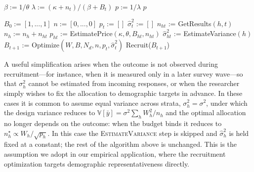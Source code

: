 \documentclass[letterpaper,12pt]{article}
\theoremstyle{proposition}
\begin{document}
\begin{algorithm}
\caption{Optimizing Stratified Recruitment with Unknown Costs and Variances}
\begin{algorithmic}
 
\State $\beta := 1 / \theta$ 
\State $\lambda := (\kappa + n_t) / (\beta + B_t)$ 
\State $p := 1 / \lambda$ 
\State \Return $p$ 
\EndProcedure

\State $B_0 := [1,...,1]$ 
\State $n := [0,...,0]$ 
 
  \State $p_t := []$ 
  \State $\hat\sigma^2_t := []$ 
   
    \State $n_{ht}$ := GetResults$(h, t)$ 
    \State $n_h := n_h + n_{ht}$ 
    \State $p_{ht}$ := EstimatePrice$(\kappa, \theta, B_{ht}, n_{ht})$ 
    \State $\hat\sigma^2_{ht}$ := EstimateVariance$(h)$ 
  \EndFor
  \State $B_{t+1}$ := Optimize$(W, B, N_d, n, p_t, \hat\sigma^2_t)$ 
  \State Recruit($B_{t+1}$) 
\EndFor
\EndProcedure
\end{algorithmic}
\end{algorithm}

A useful simplification arises when the outcome is not observed during recruitment---for instance, when it is measured only in a later survey wave---so that $\sigma_h^2$ cannot be estimated from incoming responses, or when the researcher simply wishes to fix the allocation to demographic targets in advance. In these cases it is common to assume equal variance across strata, $\sigma_h^2 = \sigma^2$, under which the design variance reduces to $\mathbb{V}[\bar{y}] = \sigma^2 \sum_h W_h^2/n_h$ and the optimal allocation no longer depends on the outcome: when the budget binds it reduces to $n_h^\star \propto W_h/\sqrt{p_h}$. In this case the \textsc{EstimateVariance} step is skipped and $\hat\sigma^2_h$ is held fixed at a constant; the rest of the algorithm above is unchanged. This is the assumption we adopt in our empirical application, where the recruitment optimization targets demographic representativeness directly.
\end{document}
